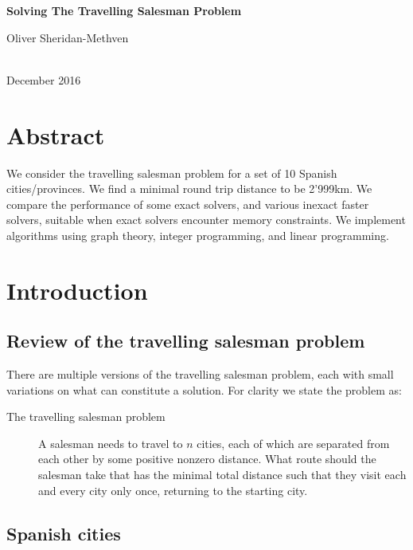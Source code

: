 \documentclass[a4paper, 11pt]{article}
\begin{document}
	
	
\begin{center}
	\begin{Large}
		\textbf{Solving The Travelling Salesman Problem}\\
	\end{Large}
	\vspace{1ex}
	\begin{large}
		Oliver Sheridan-Methven 
	\end{large}\\
	December 2016 \\
\end{center}

\section*{Abstract}
We consider the travelling salesman problem for a set of 10 Spanish cities/provinces. We find a minimal round trip distance to be 2'999\:km. We compare the performance of some exact solvers, and various inexact faster solvers, suitable when exact solvers encounter memory constraints. We implement algorithms using graph theory, integer programming, and linear programming.

\section{Introduction}
	
\subsection{Review of the travelling salesman problem}
\label{subsec:review_of_tsp}

There are multiple versions of the travelling salesman problem, each with small variations on what can constitute a solution. For clarity we state the problem as:
\begin{description}
	\item[The travelling salesman problem] A salesman needs to travel to $ n $ cities, each of which are separated from each other by some positive nonzero distance. What route should the salesman take that has the minimal total distance such that they visit each and every city only once, returning to the starting city.
\end{description}


\subsection{Spanish cities}
\label{subsec:spanish_cities}
\end{document}
